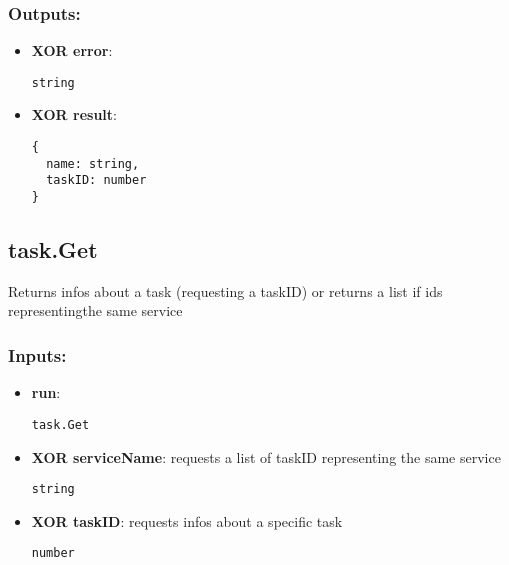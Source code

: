\subsubsection*{Outputs:}
\begin{itemize}
    \item \textbf{XOR error}: 
\begin{lstlisting}
string
\end{lstlisting}
    \item \textbf{XOR result}: 
\begin{lstlisting}
{
  name: string, 
  taskID: number
}
\end{lstlisting}
  \end{itemize}

\subsection{task.Get}
\label{ch:builtinservices:task.Get}
Returns infos about a task (requesting a taskID) or returns a list if ids representingthe same service
\subsubsection*{Inputs:}
\begin{itemize}
    \item \textbf{run}: 
\begin{lstlisting}
task.Get
\end{lstlisting}
    \item \textbf{XOR serviceName}: requests a list of taskID representing the same service
\begin{lstlisting}
string
\end{lstlisting}
    \item \textbf{XOR taskID}: requests infos about a specific task
\begin{lstlisting}
number
\end{lstlisting}
  \end{itemize}

